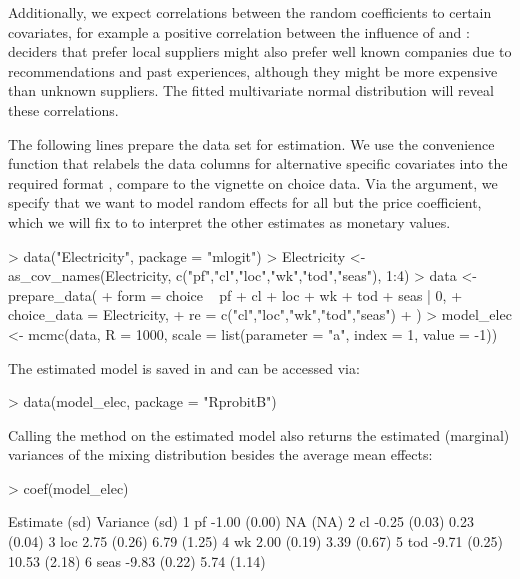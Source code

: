 \documentclass[article]{jss}
\newcommand{\fct}[1]{\code{#1()}}
\begin{document}
Additionally, we expect correlations between the random coefficients to certain covariates, for example a positive correlation between the influence of  and : deciders that prefer local suppliers might also prefer well known companies due to recommendations and past experiences, although they might be more expensive than unknown suppliers. The fitted multivariate normal distribution will reveal these correlations.

The following lines prepare the  data set for estimation. We use the convenience function \fct{as\_cov\_names} that relabels the data columns for alternative specific covariates into the required format , compare to the vignette on choice data. Via the  argument, we specify that we want to model random effects for all but the price coefficient, which we will fix to  to interpret the other estimates as monetary values.

\begin{Schunk}
\begin{Sinput}
> data("Electricity", package = "mlogit")
> Electricity <- as_cov_names(Electricity, c("pf","cl","loc","wk","tod","seas"), 1:4)
> data <- prepare_data(
+    form = choice ~ pf + cl + loc + wk + tod + seas | 0,
+    choice_data = Electricity,
+    re = c("cl","loc","wk","tod","seas")
+    )
> model_elec <- mcmc(data, R = 1000, scale = list(parameter = "a", index = 1, value = -1))
\end{Sinput}
\end{Schunk}

The estimated model is saved in  and can be accessed via:

\begin{Schunk}
\begin{Sinput}
> data(model_elec, package = "RprobitB")
\end{Sinput}
\end{Schunk}

Calling the \fct{coef} method on the estimated model also returns the estimated (marginal) variances of the mixing distribution besides the average mean effects:

\begin{Schunk}
\begin{Sinput}
> coef(model_elec)
\end{Sinput}
\begin{Soutput}
        Estimate   (sd) Variance   (sd)
1   pf     -1.00 (0.00)       NA   (NA)
2   cl     -0.25 (0.03)     0.23 (0.04)
3  loc      2.75 (0.26)     6.79 (1.25)
4   wk      2.00 (0.19)     3.39 (0.67)
5  tod     -9.71 (0.25)    10.53 (2.18)
6 seas     -9.83 (0.22)     5.74 (1.14)
\end{Soutput}
\end{Schunk}
\end{document}
